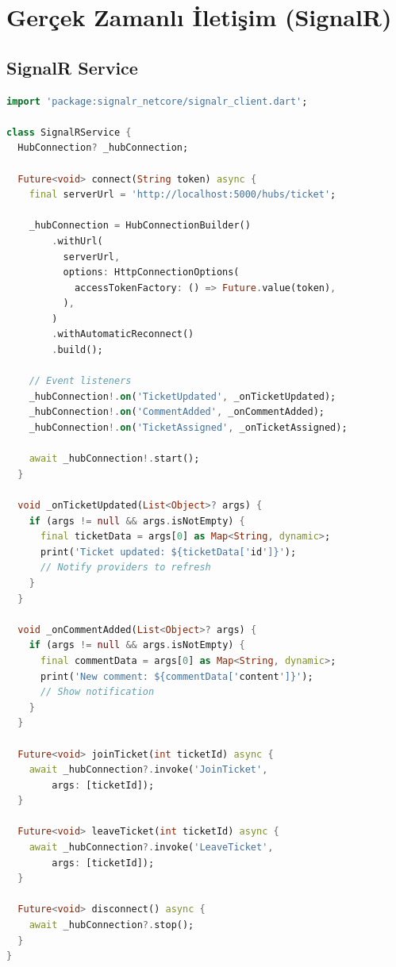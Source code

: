 \documentclass[12pt,a4paper]{article}
\begin{document}
\newpage

\section{Gerçek Zamanlı İletişim (SignalR)}

\subsection{SignalR Service}

\begin{lstlisting}[language=Dart]
import 'package:signalr_netcore/signalr_client.dart';

class SignalRService {
  HubConnection? _hubConnection;
  
  Future<void> connect(String token) async {
    final serverUrl = 'http://localhost:5000/hubs/ticket';
    
    _hubConnection = HubConnectionBuilder()
        .withUrl(
          serverUrl,
          options: HttpConnectionOptions(
            accessTokenFactory: () => Future.value(token),
          ),
        )
        .withAutomaticReconnect()
        .build();
    
    // Event listeners
    _hubConnection!.on('TicketUpdated', _onTicketUpdated);
    _hubConnection!.on('CommentAdded', _onCommentAdded);
    _hubConnection!.on('TicketAssigned', _onTicketAssigned);
    
    await _hubConnection!.start();
  }
  
  void _onTicketUpdated(List<Object>? args) {
    if (args != null && args.isNotEmpty) {
      final ticketData = args[0] as Map<String, dynamic>;
      print('Ticket updated: ${ticketData['id']}');
      // Notify providers to refresh
    }
  }
  
  void _onCommentAdded(List<Object>? args) {
    if (args != null && args.isNotEmpty) {
      final commentData = args[0] as Map<String, dynamic>;
      print('New comment: ${commentData['content']}');
      // Show notification
    }
  }
  
  Future<void> joinTicket(int ticketId) async {
    await _hubConnection?.invoke('JoinTicket', 
        args: [ticketId]);
  }
  
  Future<void> leaveTicket(int ticketId) async {
    await _hubConnection?.invoke('LeaveTicket', 
        args: [ticketId]);
  }
  
  Future<void> disconnect() async {
    await _hubConnection?.stop();
  }
}
\end{lstlisting}
\end{document}

